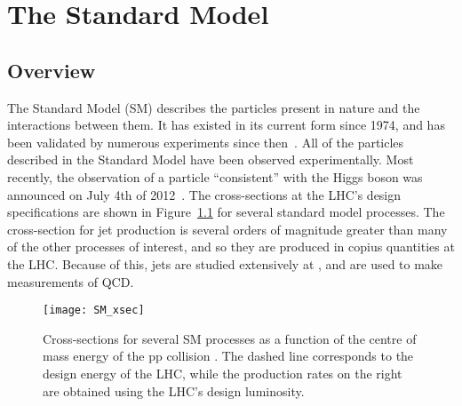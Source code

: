 \chapter{The Standard Model}
\label{chap_SM}
\section{Overview}

The Standard Model (SM) describes the particles present in nature and the interactions between them. It has existed in its current form since 1974, and has been validated by numerous experiments since then~\cite{LEP,tevatron_top}. All of the particles described in the Standard Model have been observed experimentally. Most recently, the observation of a particle ``consistent'' with the Higgs boson was announced on July 4th of 2012~\cite{CernHiggsPR,ATLAS_higgs}. The cross-sections at the LHC's design specifications are shown in Figure~\ref{SMxsec} for several standard model processes. The cross-section for jet production is several orders of magnitude greater than many of the other processes of interest, and so they are produced in copius quantities at the LHC. Because of this, jets are studied extensively at \atlas, and are used to make measurements of QCD.
%
\begin{figure}[tb]
\begin{center}
\texttt{[image: SM\_xsec]}
\end{center}
\caption[Production cross-sections at the LHC]{Cross-sections for several SM processes as a function of the centre of mass energy of the pp collision \cite{Flugge}. The dashed line corresponds to the design energy of the LHC, while the production rates on the right are obtained using the LHC's design luminosity.}
\label{SMxsec}
\end{figure}



